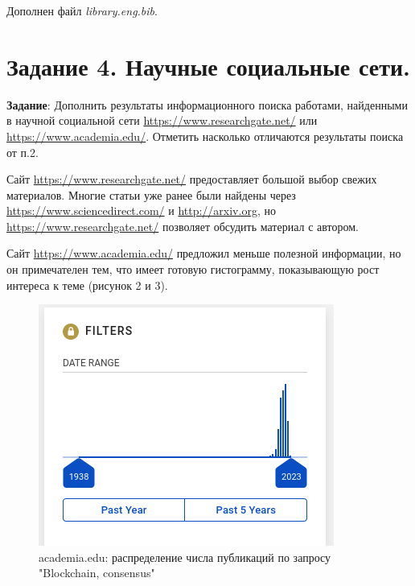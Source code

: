 \documentclass[a4paper, 12pt]{report}		%
\begin{document}
Дополнен файл \textit{library.eng.bib}.

\chapter*{Задание 4. Научные социальные сети.}

\textbf{Задание}: Дополнить результаты информационного поиска работами, найденными в научной социальной сети \url{https://www.researchgate.net/} или \url{https://www.academia.edu/}. Отметить насколько отличаются результаты поиска от п.2.

\vspace{1cm}

Сайт \url{https://www.researchgate.net/} предоставляет большой выбор свежих материалов. Многие статьи уже ранее были найдены через \url{https://www.sciencedirect.com/} и \url{http://arxiv.org}, но \url{https://www.researchgate.net/} позволяет обсудить материал с автором.

Сайт \url{https://www.academia.edu/} предложил меньше полезной информации, но он примечателен тем, что имеет готовую гистограмму, показывающую рост интереса к теме (рисунок 2 и 3).

\begin{figure}[H]
 \centering
 \includegraphics[scale=0.6]{res/academia1}
 \caption{academia.edu: распределение числа публикаций по запросу "Blockchain, consensus"}
\end{figure}
\end{document}
